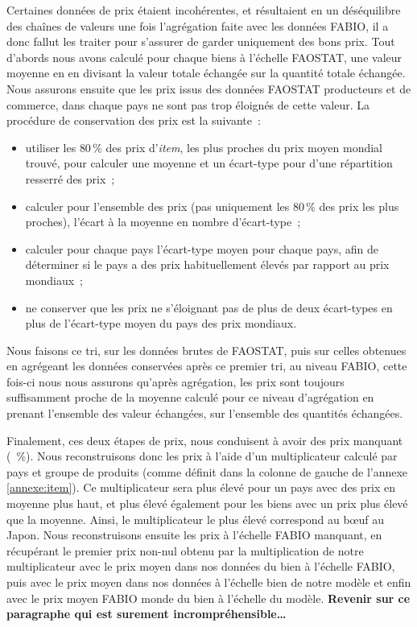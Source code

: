 Certaines données de prix étaient incohérentes, et résultaient en un déséquilibre des chaînes de valeurs une fois l'agrégation faite avec les données FABIO, il a donc fallut les traiter pour s'assurer de garder uniquement des bons prix. Tout d'abords nous avons calculé pour chaque biens à l'échelle FAOSTAT, une valeur moyenne en en divisant la valeur totale échangée sur la quantité totale échangée. Nous assurons ensuite que les prix issus des données FAOSTAT producteurs et de commerce, dans chaque pays ne sont pas trop éloignés de cette valeur. La procédure de conservation des prix est la suivante~:
\begin{itemize}
    \item utiliser les {80\,\%} des prix d'\textit{item}, les plus proches du prix moyen mondial trouvé, pour calculer une moyenne et un écart-type pour d'une répartition resserré des prix~;
    \item calculer pour l'ensemble des prix (pas uniquement les 80\,\% des prix les plus proches), l'écart à la moyenne en nombre d’écart-type~;
    \item calculer pour chaque pays l'écart-type moyen pour chaque pays, afin de déterminer si le pays a des prix habituellement élevés par rapport au prix mondiaux~;
    \item ne conserver que les prix ne s'éloignant pas de plus de deux écart-types en plus de l'écart-type moyen du pays des prix mondiaux.
\end{itemize}
Nous faisons ce tri, sur les données brutes de FAOSTAT, puis sur celles obtenues en agrégeant les données conservées après ce premier tri, au niveau FABIO, cette fois-ci nous nous assurons qu'après agrégation, les prix sont toujours suffisamment proche de la moyenne calculé pour ce niveau d'agrégation en prenant l'ensemble des valeur échangées, sur l'ensemble des quantités échangées.

Finalement, ces deux étapes de prix, nous conduisent à avoir des prix manquant (~\%). Nous reconstruisons donc les prix à l'aide d'un multiplicateur calculé par pays et groupe de produits (comme définit dans la colonne de gauche de l'annexe \ref{annexe:item}). Ce multiplicateur sera plus élevé pour un pays avec des prix en moyenne plus haut, et plus élevé également pour les biens avec un prix plus élevé que la moyenne. Ainsi, le multiplicateur le plus élevé correspond au bœuf au Japon. Nous reconstruisons ensuite les prix à l'échelle FABIO manquant, en récupérant le premier prix non-nul obtenu par la multiplication de notre multiplicateur avec le prix moyen dans nos données du bien à l'échelle FABIO, puis avec le prix moyen dans nos données à l'échelle bien de notre modèle et enfin avec le prix moyen FABIO monde du bien à l'échelle du modèle. \textbf{Revenir sur ce paragraphe qui est surement incrompréhensible\dots}


